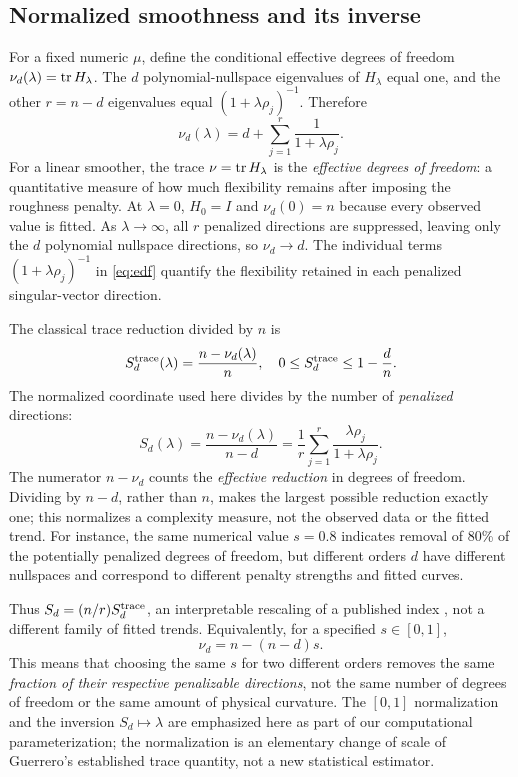 \subsection{Normalized smoothness and its inverse}\label{sec:smoothness}
For a fixed numeric $\mu$, define the conditional effective degrees of freedom $\nu_d(\lambda)=\operatorname{tr} H_\lambda$. The $d$ polynomial-nullspace eigenvalues of $H_\lambda$ equal one, and the other $r=n-d$ eigenvalues equal $(1+\lambda\rho_j)^{-1}$. Therefore
\begin{equation}\label{eq:edf}
\nu_d(\lambda)=d+\sum_{j=1}^r\frac{1}{1+\lambda\rho_j}.
\end{equation}
For a linear smoother, the trace $\nu=\operatorname{tr} H_\lambda$
is the \emph{effective degrees of freedom}: a
quantitative measure of how much flexibility
remains after imposing the roughness penalty.
At $\lambda=0$, $H_0=I$ and
$\nu_d(0)=n$ because every observed value is fitted.
As $\lambda\to\infty$, all $r$ penalized directions
are suppressed, leaving only the $d$ polynomial
nullspace directions, so $\nu_d\to d$.
The individual terms $(1+\lambda\rho_j)^{-1}$
in \eqref{eq:edf} quantify the flexibility retained
in each penalized singular-vector direction.

The classical trace reduction divided by $n$ is
\begin{equation}\label{eq:classicalS}
S^{\rm trace}_d(\lambda)=\frac{n-\nu_d(\lambda)}{n},
\quad 0\le S^{\rm trace}_d\le1-\frac dn.
\end{equation}
The normalized coordinate used here divides by the number of \emph{penalized} directions:
\begin{equation}\label{eq:S}
S_d(\lambda)=\frac{n-\nu_d(\lambda)}{n-d}
=\frac{1}{r}\sum_{j=1}^r\frac{\lambda\rho_j}{1+\lambda\rho_j}.
\end{equation}
The numerator $n-\nu_d$ counts the
\emph{effective reduction} in degrees of freedom.
Dividing by $n-d$, rather than $n$, makes the
largest possible reduction exactly one; this
normalizes a complexity measure, not the
observed data or the fitted trend.
For instance, the same numerical value
$s=0.8$ indicates removal of 80\% of the
potentially penalized degrees of freedom,
but different orders $d$ have different
nullspaces and correspond to different
penalty strengths and fitted curves.

Thus $S_d=(n/r)S_d^{\rm trace}$,
an interpretable rescaling of a published index
\citep{guerrero2007,guerrero2008,cortes2017},
not a different family of fitted trends.
Equivalently, for a specified $s\in[0,1]$,
\begin{equation}\label{eq:edf-at-fixed-s}
\nu_d=n-(n-d)s.
\end{equation}
This means that choosing the same $s$ for
two different orders removes the same
\emph{fraction of their respective
penalizable directions}, not the same
number of degrees of freedom or the same
amount of physical curvature. The
$[0,1]$ normalization and the inversion
$S_d\mapsto\lambda$ are emphasized here as
part of our computational parameterization;
the normalization is an elementary change
of scale of Guerrero's established trace
quantity, not a new statistical estimator.


